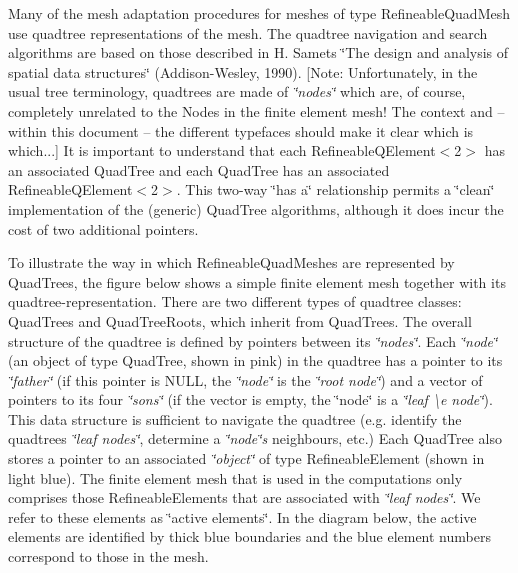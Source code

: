 Many of the mesh adaptation procedures for meshes of type {\ttfamily Refineable\+Quad\+Mesh} use quadtree representations of the mesh. The quadtree navigation and search algorithms are based on those described in H. Samet\textquotesingle{}s \char`\"{}\+The 
 design and analysis of spatial data structures\char`\"{} (Addison-\/\+Wesley, 1990). \mbox{[}Note\+: Unfortunately, in the usual tree terminology, quadtrees are made of {\itshape \char`\"{}nodes\char`\"{}} which are, of course, completely unrelated to the {\ttfamily Nodes} in the finite element mesh! The context and -- within this document -- the different typefaces should make it clear which is which...\mbox{]} It is important to understand that each {\ttfamily Refineable\+Q\+Element$<$2$>$} has an associated {\ttfamily Quad\+Tree} and each {\ttfamily Quad\+Tree} has an associated {\ttfamily Refineable\+Q\+Element$<$2$>$}. This two-\/way \char`\"{}has a\char`\"{} relationship permits a \char`\"{}clean\char`\"{} implementation of the (generic) {\ttfamily Quad\+Tree} algorithms, although it does incur the cost of two additional pointers.

To illustrate the way in which {\ttfamily Refineable\+Quad\+Meshes} are represented by {\ttfamily Quad\+Trees}, the figure below shows a simple finite element mesh together with its quadtree-\/representation. There are two different types of quadtree classes\+: {\ttfamily Quad\+Trees} and {\ttfamily Quad\+Tree\+Roots}, which inherit from {\ttfamily Quad\+Trees}. The overall structure of the quadtree is defined by pointers between its {\itshape \char`\"{}nodes\char`\"{}}. Each {\itshape \char`\"{}node\char`\"{}} (an object of type {\ttfamily Quad\+Tree}, shown in pink) in the quadtree has a pointer to its {\itshape \char`\"{}father\char`\"{}} (if this pointer is N\+U\+LL, the {\itshape \char`\"{}node\char`\"{}} is the {\itshape \char`\"{}root node\char`\"{}}) and a vector of pointers to its four {\itshape \char`\"{}sons\char`\"{}} (if the vector is empty, the \char`\"{}node\char`\"{} is a {\itshape \char`\"{}leaf 
 \textbackslash{}e node\char`\"{}}). This data structure is sufficient to navigate the quadtree (e.\+g. identify the quadtree\textquotesingle{}s {\itshape \char`\"{}leaf nodes\char`\"{}}, determine a {\itshape \char`\"{}node\char`\"{}\textquotesingle{}s} neighbours, etc.) Each {\ttfamily Quad\+Tree} also stores a pointer to an associated {\itshape \char`\"{}object\char`\"{}} of type {\ttfamily Refineable\+Element} (shown in light blue). The finite element mesh that is used in the computations only comprises those {\ttfamily Refineable\+Elements} that are associated with {\itshape \char`\"{}leaf nodes\char`\"{}}. We refer to these elements as \char`\"{}active elements\char`\"{}. In the diagram below, the active elements are identified by thick blue boundaries and the blue element numbers correspond to those in the mesh.

